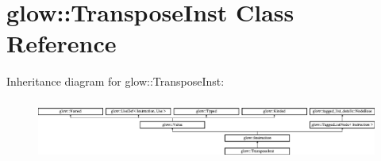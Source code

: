 \hypertarget{classglow_1_1_transpose_inst}{}\section{glow\+:\+:Transpose\+Inst Class Reference}
\label{classglow_1_1_transpose_inst}
Inheritance diagram for glow\+:\+:Transpose\+Inst\+:\begin{figure}[H]
\begin{center}
\leavevmode
\includegraphics[height=1.991111cm]{classglow_1_1_transpose_inst}
\end{center}
\end{figure}
